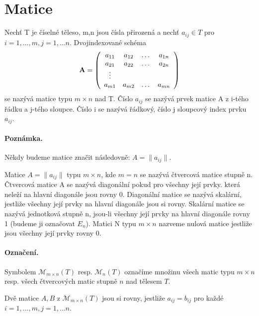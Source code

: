 \section{Matice}
\begin{definition}
	Nechť T je číselné těleso, m,n jsou čísla přirozená a nechť $a_{ij} \in T$  pro $i = 1, \dots, m, j = 1, \dots n.$ Dvojindexované schéma
\begin{displaymath}
{\bf A} =
\left( \begin{array}{cccc}
a_{11} & a_{12} & \dots & a_{1n} \\
a_{21} & a_{22} & \dots & a_{2n} \\
\vdots &  &  &  \\
a_{m1} & a_{m2} & \dots & a_{mn} \\
\end{array} \right)
\end{displaymath}
se nazývá matice typu $m \times n$ nad T. Číslo $a_{ij}$ se nazývá prvek matice A z i-tého řádku a j-tého sloupce. Číslo i se nazývá řádkový, číslo j sloupcový index prvku $a_{ij}$.
\end{definition}

\paragraph{Poznámka.} Někdy budeme matice značit následovně: $A = \| a_{ij}\|$.

\begin{definition}
	Matice $A = \|a_{ij}\|$ typu $m \times n$, kde $m = n$ se nazývá čtvercová matice stupně n. Čtvercová matice A se nazývá diagonální pokud pro všechny její prvky. která neleží na hlavní diagonále jsou rovny 0. Diagonální matice se nazývá skalární, jestliže všechny její prvky na hlavní diagonále jsou si rovny. Skalární matice se nazývá jednotková stupně n, jsou-li všechny její prvky na hlavní diagonále rovny 1 (budeme ji označovat $E_n$). Matici N typu $m \times n$ nazveme nulová matice jestliže jsou všechny její prvky rovny 0.
\end{definition}

\paragraph{Označení.} Symbolem $\mathscr{M}_{m \times n}(T)$ resp. $\mathscr{M}_{n}(T)$ označíme množinu všech matic typu $m \times n$ resp. všech čtvercových matic stupně $n$ nad tělesem $T$.

\begin{definition}
	Dvě matice $A,B$ z $\mathscr{M}_{m \times n}(T)$ jsou si rovny, jestliže $a_{ij} = b_{ij}$ pro každé  $i = 1, \dots, m, j = 1, \dots n.$
\end{definition}

